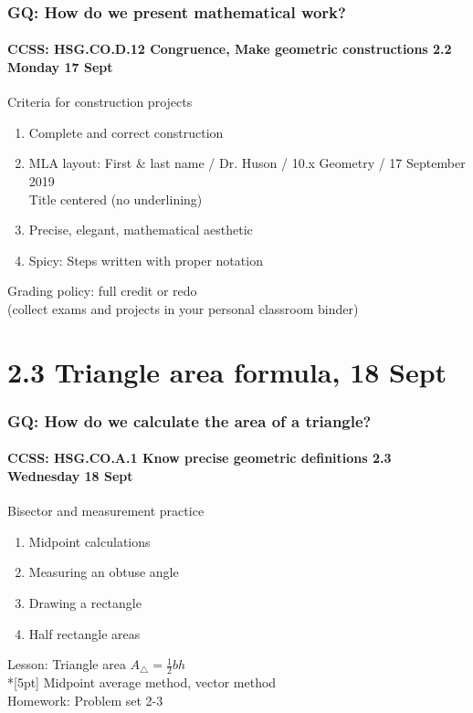 \documentclass{beamer}
\begin{document}
  \frame
  {
    \frametitle{GQ: How do we present mathematical work?}
    \framesubtitle{CCSS: HSG.CO.D.12 Congruence, Make geometric constructions  \hfill \alert{2.2 Monday 17 Sept}}

    \begin{block}{Criteria for construction projects}
    \begin{enumerate}
        \item Complete and correct construction
        \item MLA layout: First \& last name / Dr. Huson / 10.x Geometry / 17 September 2019 \\
        Title centered (no underlining)
        \item Precise, elegant, mathematical aesthetic
        \item Spicy: Steps written with proper notation
    \end{enumerate}
    \end{block}
    Grading policy: full credit or redo\\[5pt]
    (collect exams and projects in your personal classroom binder)
  }

    \section{2.3 Triangle area formula, 18 Sept}
    \frame
    {
      \frametitle{GQ: How do we calculate the area of a triangle?}
      \framesubtitle{CCSS: HSG.CO.A.1 Know precise geometric definitions \hfill \alert{2.3 Wednesday 18 Sept}}
  
      \begin{block}{Bisector and measurement practice}
      \begin{enumerate}
        \item Midpoint calculations
        \item Measuring an obtuse angle
        \item Drawing a rectangle
        \item Half rectangle areas
      \end{enumerate}
      \end{block}
      Lesson: Triangle area $A_{\triangle} = \frac{1}{2}bh$ \\*[5pt]
      Midpoint average method, vector method\\ \smallskip
      Homework: Problem set 2-3 
    }
\end{document}
